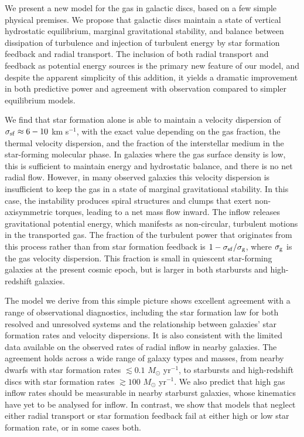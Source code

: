 \documentclass[useAMS,usenatbib]{mn2e}
\begin{document}
We present a new model for the gas in galactic discs, based on a few simple physical premises. We propose that galactic discs maintain a state of vertical hydrostatic equilibrium, marginal gravitational stability, and balance between dissipation of turbulence and injection of turbulent energy by star formation feedback and radial transport. The inclusion of both radial transport and feedback as potential energy sources is the primary new feature of our model, and despite the apparent simplicity of this addition, it yields a dramatic improvement in both predictive power and agreement with observation compared to simpler equilibrium models.

We find that star formation alone is able to maintain a velocity dispersion of $\sigma_{\rm sf} \approx 6 - 10$ km s$^{-1}$, with the exact value depending on the gas fraction, the thermal velocity dispersion, and the fraction of the interstellar medium in the star-forming molecular phase. In galaxies where the gas surface density is low, this is sufficient to maintain energy and hydrostatic balance, and there is no net radial flow. However, in many observed galaxies this velocity dispersion is insufficient to keep the gas in a state of marginal gravitational stability. In this case, the instability produces spiral structures and clumps that exert non-axisymmetric torques, leading to a net mass flow inward. The inflow releases gravitational potential energy, which manifests as non-circular, turbulent motions in the transported gas. The fraction of the turbulent power that originates from this process rather than from star formation feedback is $1 - \sigma_{\rm sf}/\sigma_{\rm g}$, where $\sigma_{\rm g}$ is the gas velocity dispersion. This fraction is small in quiescent star-forming galaxies at the present cosmic epoch, but is larger in both starbursts and high-redshift galaxies.

The model we derive from this simple picture shows excellent agreement with a range of observational diagnostics, including the star formation law for both resolved and unresolved systems and the relationship between galaxies' star formation rates and velocity dispersions. It is also consistent with the limited data available on the observed rates of radial inflow in nearby galaxies. The agreement holds across a wide range of galaxy types and masses, from nearby dwarfs with star formation rates $\lesssim 0.1$ $M_\odot$ yr$^{-1}$, to starbursts and high-redshift discs with star formation rates $\gtrsim 100$ $M_\odot$ yr$^{-1}$. We also predict that high gas inflow rates should be measurable in nearby starburst galaxies, whose kinematics have yet to be analysed for inflow. In contrast, we show that models that neglect either radial transport or star formation feedback fail at either high or low star formation rate, or in some cases both.
\end{document}
